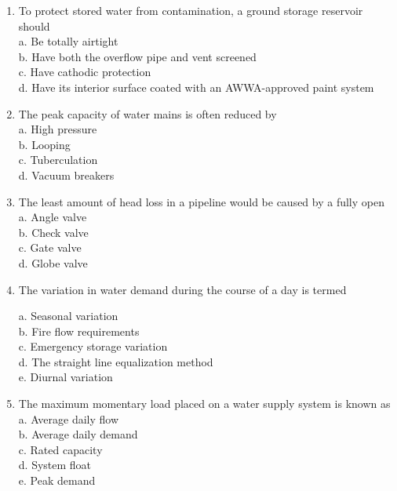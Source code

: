 \begin{enumerate}[1.]
  \item To protect stored water from contamination, a ground storage reservoir should\\


a. Be totally airtight\\

b. Have both the overflow pipe and vent screened\\

c. Have cathodic protection\\

d. Have its interior surface coated with an AWWA-approved paint system\\

\item The peak capacity of water mains is often reduced by\\

a. High pressure\\

b. Looping\\

c. Tuberculation\\

d. Vacuum breakers\\

\item The least amount of head loss in a pipeline would be caused by a fully open\\
a. Angle valve\\
b. Check valve\\
c. Gate valve\\
d. Globe valve\\

  \item The variation in water demand during the course of a day is termed


a. Seasonal variation\\

b. Fire flow requirements\\

c. Emergency storage variation\\

d. The straight line equalization method\\

e. Diurnal variation\\

  \item The maximum momentary load placed on a water supply system is known as\\
a. Average daily flow\\
b. Average daily demand\\
c. Rated capacity\\
d. System float\\
e. Peak demand\\


\end{enumerate}
